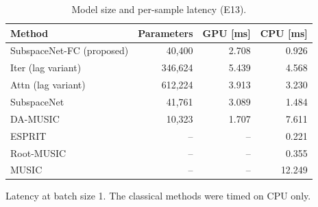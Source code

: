 \begin{table}[h!]
\centering
\small
\caption{Model size and per-sample latency (E13).}
\label{tab:complexity}
\begin{tabular}{lrrr}
\toprule
Method & Parameters & GPU [ms] & CPU [ms] \\
\midrule
SubspaceNet-FC (proposed) & 40,400 & 2.708 & 0.926 \\
Iter (lag variant) & 346,624 & 5.439 & 4.568 \\
Attn (lag variant) & 612,224 & 3.913 & 3.230 \\
SubspaceNet & 41,761 & 3.089 & 1.484 \\
DA-MUSIC & 10,323 & 1.707 & 7.611 \\
\midrule
ESPRIT & -- & -- & 0.221 \\
Root-MUSIC & -- & -- & 0.355 \\
MUSIC & -- & -- & 12.249 \\
\hline
\end{tabular}
\par\smallskip\parbox{0.95\textwidth}{\footnotesize Latency at batch size 1. The classical methods were timed on CPU only.}
\end{table}
